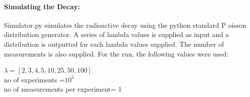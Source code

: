 \documentclass[12pt]{article}
\begin{document}
\paragraph{Simulating the Decay:}
Simulator.py simulates the radioactive decay using the python standard P
oisson distribution generator. A series of lambda values is supplied as input and a distribution is outputted for each lambda values supplied. The number of measurements is also supplied.
For the run, the following values were used:
\begin{center}

	$\lambda=[2,3,4,5,10,25,50,100]$\\

	no of experiments =$10^5$ \\
	no of measurements per experiment= 1\\	
	
\end{center}
\end{document}

